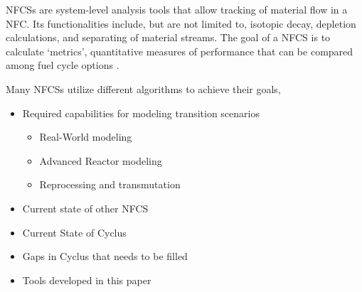\glspl{NFCS} are system-level analysis tools
that allow tracking of material flow in a \gls{NFC}. Its
functionalities include, but are not limited to, isotopic decay,
depletion calculations, and separating of material streams.
The goal of a \gls{NFCS} is to calculate `metrics', quantitative
measures of performance that can be compared among fuel cycle
options \cite{huff_fundamental_2016}.

Many \glspl{NFCS} utilize different algorithms to achieve
their goals,

\begin{itemize}
	\item Required capabilities for modeling transition scenarios
	\begin{itemize}
		\item Real-World modeling
		\item Advanced Reactor modeling
		\item Reprocessing and transmutation
	\end{itemize}
	\item Current state of other \gls{NFCS}
	\item Current State of Cyclus
	\item Gaps in Cyclus that needs to be filled
	\item Tools developed in this paper
\end{itemize}